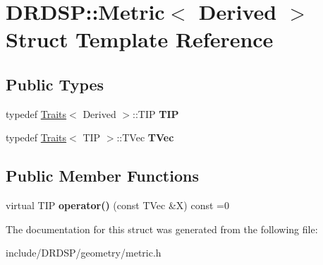 \hypertarget{struct_d_r_d_s_p_1_1_metric}{\section{D\-R\-D\-S\-P\-:\-:Metric$<$ Derived $>$ Struct Template Reference}
\label{struct_d_r_d_s_p_1_1_metric}
}
\subsection*{Public Types}
\begin{DoxyCompactItemize}
\item 
\hypertarget{struct_d_r_d_s_p_1_1_metric_af320bd0a4c60f0d80ab886a2a017c1a1}{typedef \hyperlink{struct_d_r_d_s_p_1_1_traits}{Traits}$<$ Derived $>$\-::T\-I\-P {\bfseries T\-I\-P}}\label{struct_d_r_d_s_p_1_1_metric_af320bd0a4c60f0d80ab886a2a017c1a1}

\item 
\hypertarget{struct_d_r_d_s_p_1_1_metric_a8d9c7b616817989b17a2635e6587bd76}{typedef \hyperlink{struct_d_r_d_s_p_1_1_traits}{Traits}$<$ T\-I\-P $>$\-::T\-Vec {\bfseries T\-Vec}}\label{struct_d_r_d_s_p_1_1_metric_a8d9c7b616817989b17a2635e6587bd76}

\end{DoxyCompactItemize}
\subsection*{Public Member Functions}
\begin{DoxyCompactItemize}
\item 
\hypertarget{struct_d_r_d_s_p_1_1_metric_af576d41e6582b058e4251c13195c0caf}{virtual T\-I\-P {\bfseries operator()} (const T\-Vec \&X) const =0}\label{struct_d_r_d_s_p_1_1_metric_af576d41e6582b058e4251c13195c0caf}

\end{DoxyCompactItemize}


The documentation for this struct was generated from the following file\-:\begin{DoxyCompactItemize}
\item 
include/\-D\-R\-D\-S\-P/geometry/metric.\-h\end{DoxyCompactItemize}

